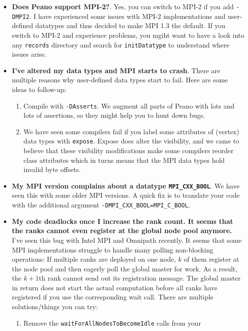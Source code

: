 \begin{itemize}
  \item {\bf Does Peano support MPI-2?}. Yes, you can switch to MPI-2 if you add
  \texttt{-DMPI2}. I have experienced some issues with MPI-2 implementations and
  user-defined datatypes and thus decided to make MPI 1.3 the default. If you
  switch to MPI-2 and experience problems, you  mgiht want to have a look into
  any \texttt{records} directory and search for \texttt{initDatatype} to
  understand where issues arise.
  \item {\bf I've altered my data types and MPI starts to crash}. There are
  multiple reasons why user-defined data types start to fail. Here are some
  ideas to follow-up:
    \begin{enumerate}
      \item Compile with \texttt{-DAsserts}. We augment all parts of Peano with
      lots and lots of assertions, so they might help you to hunt down bugs.
      \item We have seen some compilers fail if you label some attributes of
      (vertex) data types with \texttt{expose}. Expose does alter the
      visibility, and we came to believe that these visibility modifications
      make some compilers reorder class attributes which in turns means that the
      MPI data types hold invalid byte offsets.
    \end{enumerate}
  \item {\bf My MPI version complains about a datatype \texttt{MPI\_CXX\_BOOL}}. 
    We have seen this with some older MPI versions. A quick fix is to translate
    your code with the additional argument
    \texttt{-DMPI\_CXX\_BOOL=MPI\_C\_BOOL}.
  \item {\bf My code deadlocks once I increase the rank count. It seems that
    the ranks cannot even register at the global node pool anymore.}
    I've seen this bug with Intel MPI and Omnipath recently. It seems that some
    MPI implementations struggle to handle many polling non-blocking operations:
    If multiple ranks are deployed on one node, $k$ of them register at the node
    pool and then eagerly poll the global master for work. As a result, the
    $k+1$th rank cannot send out its registration message. The global master in
    return does not start the actual computation before all ranks have
    registered if you use the corresponding wait call. There are multiple
    solutions/things you can try:
    \begin{enumerate}
      \item Remove the \texttt{waitForAllNodesToBecomeIdle} calls from your

\end{enumerate}
\end{itemize}
